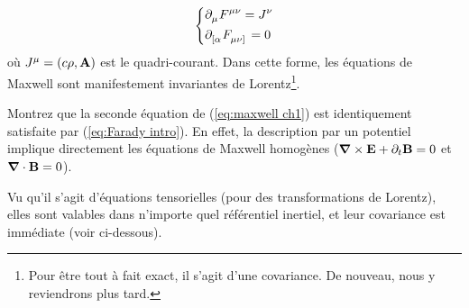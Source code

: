 \begin{align}
    \label{eq:maxwell ch1}
    \begin{dcases}
        \pd\indices{_\mu} F\indices{^\mu^\nu} = J\indices{^\nu} \\
        \partial\indices{_[ _\alpha} F\indices{_\mu_\nu _]} = 0
    \end{dcases}
\end{align}
où $J^\mu = (c \rho,\bm{\mathrm{A}})$ est le quadri-courant. Dans cette forme, les équations de Maxwell sont manifestement invariantes de Lorentz\footnote{Pour être tout à fait exact, il s'agit d'une covariance. De nouveau, nous y reviendrons plus tard.}.
\begin{exerc}
    \label{exercice:maxwell1}
    Montrez que la seconde équation de (\ref{eq:maxwell ch1}) est identiquement satisfaite par (\ref{eq:Farady intro}). En effet, la description par un potentiel implique directement les équations de Maxwell homogènes ($\bm{\mathrm{\nabla}} \times \bm{\mathrm{E}} + \partial_t \bm{\mathrm{B}}= 0$ et $\bm{\mathrm{\nabla}} \cdot \bm{\mathrm{B}} = 0$). 
\end{exerc}
Vu qu'il s'agit d'équations tensorielles (pour des transformations de Lorentz), elles sont valables dans n'importe quel référentiel inertiel, et leur covariance est immédiate (voir ci-dessous).
